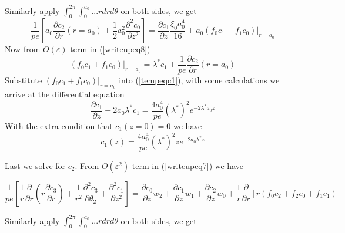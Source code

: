 \documentclass[12pt]{article}
\renewcommand{\(}{\left (}
\renewcommand{\)}{\right )}
\begin{document}
Similarly apply $\int_0^{2\pi} \int_0^{a_0} ... rdrd\theta$ on both sides, we get
\begin{equation}
    \frac{1}{pe}\left[ a_0 \frac{\partial c_2}{\partial r}(r=a_0) + \frac{1}{2}a_0^2 \frac{\partial^2 c_0}{\partial z^2} \right] = \frac{\partial c_1}{\partial z} \frac{\xi_0 a_0^4}{16} + \left.a_0 (f_0 c_1 + f_1 c_0)\right|_{r=a_0} \label{tempeqc1}
\end{equation}
Now from $O(\varepsilon)$ term in (\ref{writeupeq8})
\begin{equation}
    \left. (f_0 c_1 + f_1 c_0)\right|_{r=a_0} = \lambda^* c_1 + \frac{1}{pe} \frac{\partial c_2}{\partial r}(r=a_0)
\end{equation}
Substitute $\left. (f_0 c_1 + f_1 c_0)\right|_{r=a_0}$ into (\ref{tempeqc1}), with some calculations we arrive at the differential equation
\begin{equation}
    \frac{\partial c_1}{\partial z} + 2a_0 \lambda^* c_1 = \frac{4 a_0^4}{pe}(\lambda^*)^2 e^{-2\lambda^* a_0 z}
\end{equation}
With the extra condition that $c_1(z=0) = 0$ we have
\begin{equation}
    c_1 (z) = \frac{4a_0^4}{pe}(\lambda^*)^2 z e^{-2a_0\lambda^* z}
\end{equation}


Last we solve for $c_2.$ From $O(\varepsilon^2)$ term in (\ref{writeupeq7}) we have

\begin{equation}
    \frac{1}{pe}\left[\frac{1}{r}\frac{\partial}{\partial r} \left(r \frac{\partial c_3}{\partial r}\right) + \frac{1}{r^2} \frac{\partial^2 c_3}{\partial \theta_2} + \frac{\partial^2 c_1}{\partial z^2}\right] = \frac{\partial c_{0}}{\partial z} w_{2}+\frac{\partial c_{1}}{\partial z} w_{1}+\frac{\partial c_{2}}{\partial z} w_{0} + \frac{1}{r} \frac{\partial}{\partial r}\left[r\left(f_{0} c_{2}+f_{2} c_{0}+f_{1} c_{1}\right)\right]
\end{equation}

Similarly apply $\int_0^{2\pi} \int_0^{a_0} ... rdrd\theta$ on both sides, we get
\end{document}
